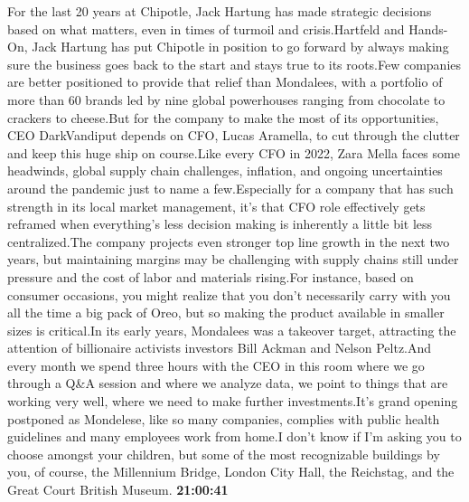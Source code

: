 \documentclass{article}%
\begin{document}
For the last 20 years at Chipotle, Jack Hartung has made strategic decisions based on what matters, even in times of turmoil and crisis.Hartfeld and Hands{-}On, Jack Hartung has put Chipotle in position to go forward by always making sure the business goes back to the start and stays true to its roots.Few companies are better positioned to provide that relief than Mondalees, with a portfolio of more than 60 brands led by nine global powerhouses ranging from chocolate to crackers to cheese.But for the company to make the most of its opportunities, CEO DarkVandiput depends on CFO, Lucas Aramella, to cut through the clutter and keep this huge ship on course.Like every CFO in 2022, Zara Mella faces some headwinds, global supply chain challenges, inflation, and ongoing uncertainties around the pandemic just to name a few.Especially for a company that has such strength in its local market management, it's that CFO role effectively gets reframed when everything's less decision making is inherently a little bit less centralized.The company projects even stronger top line growth in the next two years, but maintaining margins may be challenging with supply chains still under pressure and the cost of labor and materials rising.For instance, based on consumer occasions, you might realize that you don't necessarily carry with you all the time a big pack of Oreo, but so making the product available in smaller sizes is critical.In its early years, Mondalees was a takeover target, attracting the attention of billionaire activists investors Bill Ackman and Nelson Peltz.And every month we spend three hours with the CEO in this room where we go through a Q\&A session and where we analyze data, we point to things that are working very well, where we need to make further investments.It's grand opening postponed as Mondelese, like so many companies, complies with public health guidelines and many employees work from home.I don't know if I'm asking you to choose amongst your children, but some of the most recognizable buildings by you, of course, the Millennium Bridge, London City Hall, the Reichstag, and the Great Court British Museum.%
\textbf{21:00:41}%
\end{document}
